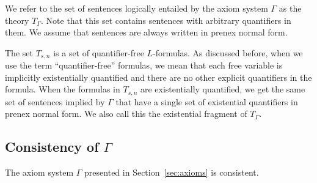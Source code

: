 We refer to the set of sentences logically entailed by the axiom
system $\Gamma$ as the theory $T_{\Gamma}$. Note that this set
contains sentences with arbitrary quantifiers in them. We assume that
sentences are always written in prenex normal form.

The set $T_{s,n}$ is a set of quantifier-free $L$-formulas. As discussed
before, when we use the term ``quantifier-free'' formulas, we mean
that each free variable is implicitly existentially quantified and
there are no other explicit quantifiers in the formula. When the
formulas in $T_{s,n}$ are existentially quantified, we get the same set
of sentences implied by $\Gamma$ that have a single set of existential
quantifiers in prenex normal form. We also call this the existential
fragment of $T_{\Gamma}$.

\subsection{Consistency of $\Gamma$}

\begin{Theorem}
  The axiom system $\Gamma$ presented in Section~\ref{sec:axioms} is consistent.
\end{Theorem}

